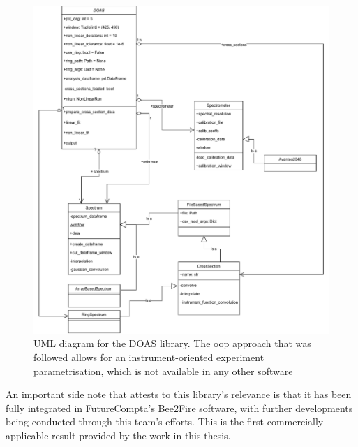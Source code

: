 \begin{figure}[htpb]
    \centering
    \includegraphics[width=0.8\linewidth]{img/pdf/uml_doas.pdf}
    \caption{UML diagram for the \gls{DOAS} library. The \gls{oop}
    approach that was followed allows for an instrument-oriented
    experiment parametrisation, which is not available in any other
    software}
    \label{fig:doas_library}
\end{figure}

An important side note that attests to this library's relevance is that
it has been fully integrated in FutureCompta's Bee2Fire software, with
further developments being conducted through this team's efforts. This
is the first commercially applicable result provided by the work in this
thesis.


